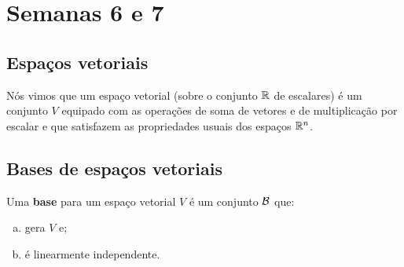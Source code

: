 \documentclass[../livro.tex]{subfiles}  %
\begin{document}
\chapter{Semanas 6 e 7}



\section{Espaços vetoriais}

Nós vimos que um espaço vetorial (sobre o conjunto $\mathbb{R}$ de escalares) é um conjunto $V$ equipado com as operações de soma de vetores e de multiplicação por escalar e que satisfazem as propriedades usuais dos espaços $\mathbb{R}^n$.



\section{Bases de espaços vetoriais}


Uma \textbf{base} para um espaço vetorial $V$ é um conjunto $\mathcal{B}$ que:
\begin{enumerate}[(a)]
	\item gera $V$ e;
	\item é linearmente independente.
\end{enumerate}
\end{document}
